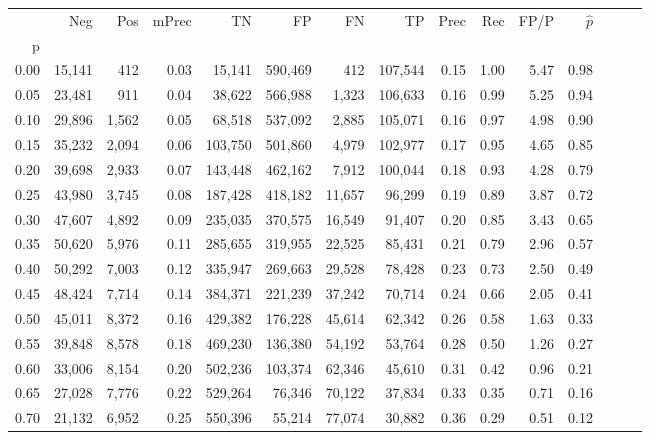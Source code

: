 \begin{tabular}{rrrrrrrrrrrrrrr}
\toprule
{} &     Neg &    Pos & mPrec &       TN &       FP &       FN &       TP &  Prec &   Rec &  FP/P & $\hat{p}$ \\
p    &         &        &       &          &          &          &          &       &       &       &           \\
\midrule
0.00 &  15,141 &    412 &  0.03 &   15,141 &  590,469 &      412 &  107,544 &  0.15 &  1.00 &  5.47 &      0.98 \\
0.05 &  23,481 &    911 &  0.04 &   38,622 &  566,988 &    1,323 &  106,633 &  0.16 &  0.99 &  5.25 &      0.94 \\
0.10 &  29,896 &  1,562 &  0.05 &   68,518 &  537,092 &    2,885 &  105,071 &  0.16 &  0.97 &  4.98 &      0.90 \\
0.15 &  35,232 &  2,094 &  0.06 &  103,750 &  501,860 &    4,979 &  102,977 &  0.17 &  0.95 &  4.65 &      0.85 \\
0.20 &  39,698 &  2,933 &  0.07 &  143,448 &  462,162 &    7,912 &  100,044 &  0.18 &  0.93 &  4.28 &      0.79 \\
0.25 &  43,980 &  3,745 &  0.08 &  187,428 &  418,182 &   11,657 &   96,299 &  0.19 &  0.89 &  3.87 &      0.72 \\
0.30 &  47,607 &  4,892 &  0.09 &  235,035 &  370,575 &   16,549 &   91,407 &  0.20 &  0.85 &  3.43 &      0.65 \\
0.35 &  50,620 &  5,976 &  0.11 &  285,655 &  319,955 &   22,525 &   85,431 &  0.21 &  0.79 &  2.96 &      0.57 \\
0.40 &  50,292 &  7,003 &  0.12 &  335,947 &  269,663 &   29,528 &   78,428 &  0.23 &  0.73 &  2.50 &      0.49 \\
0.45 &  48,424 &  7,714 &  0.14 &  384,371 &  221,239 &   37,242 &   70,714 &  0.24 &  0.66 &  2.05 &      0.41 \\
0.50 &  45,011 &  8,372 &  0.16 &  429,382 &  176,228 &   45,614 &   62,342 &  0.26 &  0.58 &  1.63 &      0.33 \\
0.55 &  39,848 &  8,578 &  0.18 &  469,230 &  136,380 &   54,192 &   53,764 &  0.28 &  0.50 &  1.26 &      0.27 \\
0.60 &  33,006 &  8,154 &  0.20 &  502,236 &  103,374 &   62,346 &   45,610 &  0.31 &  0.42 &  0.96 &      0.21 \\
0.65 &  27,028 &  7,776 &  0.22 &  529,264 &   76,346 &   70,122 &   37,834 &  0.33 &  0.35 &  0.71 &      0.16 \\
0.70 &  21,132 &  6,952 &  0.25 &  550,396 &   55,214 &   77,074 &   30,882 &  0.36 &  0.29 &  0.51 &      0.12 \\

\end{tabular}
